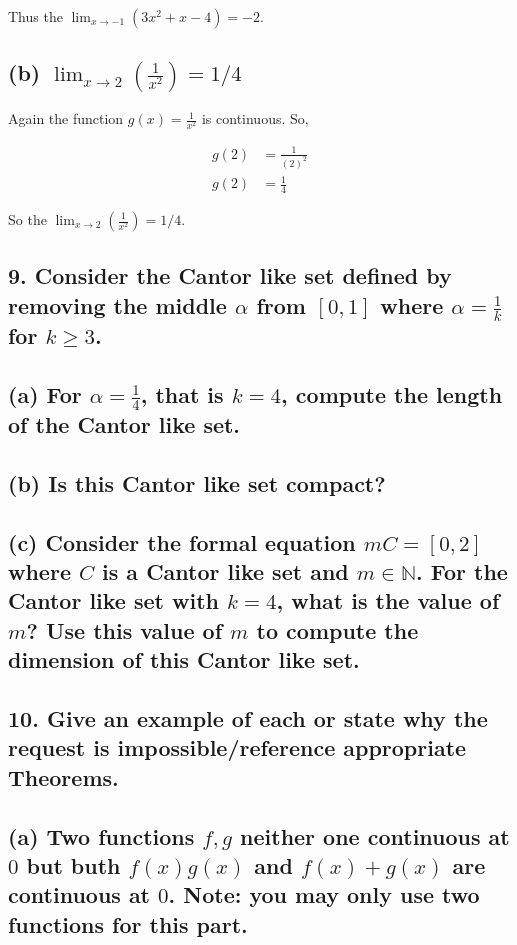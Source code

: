 \documentclass{article}
\begin{document}
Thus the $\lim_{x \to -1} \left( 3x^2 + x - 4 \right) = -2$.

\subsection*{(b) $\lim_{x \to 2} \left( \frac{1}{x^2} \right) = 1/4$}

Again the function $g(x) = \frac{1}{x^2}$ is continuous. So,

\begin{align*}
    g(2) &= \frac{1}{(2)^2} \\
    g(2) &= \frac{1}{4}
\end{align*}

So the $\lim_{x \to 2} \left( \frac{1}{x^2} \right) = 1/4$.



\subsection*{9. Consider the Cantor like set defined by removing the middle $\alpha$ from $[0,1]$ where $\alpha = \frac{1}{k}$ for $ k \ge 3$.}

\subsection*{(a) For $\alpha = \frac{1}{4}$, that is $k = 4$, compute the length of the Cantor like set.}

\subsection*{(b) Is this Cantor like set compact?}

\subsection*{(c) Consider the formal equation $mC = [0,2]$ where $C$ is a Cantor like set and $m \in \mathbb{N}$. For the Cantor like set with $k = 4$, what is the 
value of $m$? Use this value of $m$ to compute the dimension of this Cantor like set.}

\subsection*{10. Give an example of each or state why the request is impossible/reference appropriate Theorems.}

\subsection*{(a) Two functions $f, g$ neither one continuous at $0$ but buth $f(x)g(x)$ and $f(x) + g(x)$ are continuous at $0$. Note: you may only use two functions for this part.}
\end{document}
